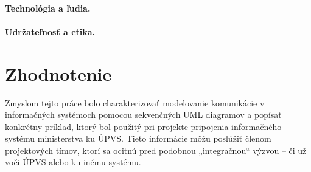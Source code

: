 \documentclass[10pt,twoside,slovak,a4paper]{article}
\begin{document}
\paragraph{Technológia a ľudia.}

\paragraph{Udržateľnosť a etika.}


\section{Zhodnotenie} \label{6sek} 
Zmyslom tejto práce bolo charakterizovať modelovanie komunikácie v informačných systémoch pomocou sekvenčných UML diagramov a popísať konkrétny príklad, ktorý bol použitý pri projekte pripojenia informačného systému ministerstva ku ÚPVS.
Tieto informácie môžu poslúžiť členom projektových tímov, ktorí sa ocitnú pred podobnou „integračnou“ výzvou – či už voči ÚPVS alebo ku inému systému. \\






 
\end{document}
